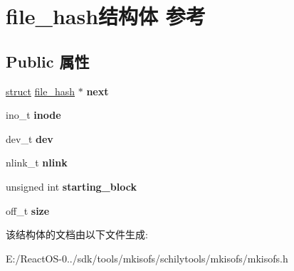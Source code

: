 \hypertarget{structfile__hash}{}\section{file\+\_\+hash结构体 参考}
\label{structfile__hash}
\subsection*{Public 属性}
\begin{DoxyCompactItemize}
\item 
\mbox{\label{structfile__hash_abded850a52752930b218c31f96ac9f78}} 
\hyperlink{interfacestruct}{struct} \hyperlink{structfile__hash}{file\+\_\+hash} $\ast$ {\bfseries next}
\item 
\mbox{\label{structfile__hash_a8b14c603b0ba5c22fe88db310872af1a}} 
ino\+\_\+t {\bfseries inode}
\item 
\mbox{\label{structfile__hash_a210b7a90af06c060c016afbe6c14fbf9}} 
dev\+\_\+t {\bfseries dev}
\item 
\mbox{\label{structfile__hash_aa7805b270b3eb8c016192cd9f71d6ab6}} 
nlink\+\_\+t {\bfseries nlink}
\item 
\mbox{\label{structfile__hash_a6899e863384e0490f400500b58f8647c}} 
unsigned int {\bfseries starting\+\_\+block}
\item 
\mbox{\label{structfile__hash_a9e978c1bc3a160377ef6c85a1f4d4494}} 
off\+\_\+t {\bfseries size}
\end{DoxyCompactItemize}


该结构体的文档由以下文件生成\+:\begin{DoxyCompactItemize}
\item 
E\+:/\+React\+O\+S-\/0../sdk/tools/mkisofs/schilytools/mkisofs/mkisofs.\+h\end{DoxyCompactItemize}
